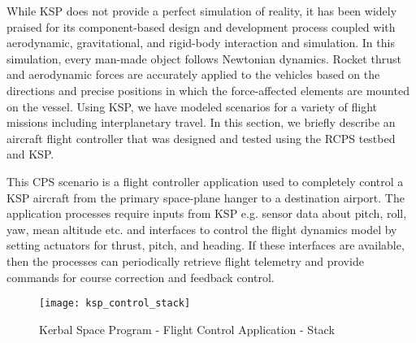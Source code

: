 While KSP does not provide a perfect simulation of reality, it has been widely praised for its component-based design and development process coupled with aerodynamic, gravitational, and rigid-body interaction and simulation. In this simulation, every man-made object follows Newtonian dynamics. Rocket thrust and aerodynamic forces are accurately applied to the vehicles based on the directions and precise positions in which the force-affected elements are mounted on the vessel. Using KSP, we have modeled scenarios for a variety of flight missions including interplanetary travel. In this section, we briefly describe an aircraft flight controller that was designed and tested using the RCPS testbed and KSP.

This CPS scenario is a flight controller application used to completely control a KSP aircraft from the primary space-plane hanger to a destination airport. The application processes require inputs from KSP e.g. sensor data about pitch, roll, yaw, mean altitude etc. and interfaces to control the flight dynamics model by setting actuators for thrust, pitch, and heading. If these interfaces are available, then the processes can periodically retrieve flight telemetry and provide commands for course correction and feedback control.

\begin{figure}[h]
	\centering
	\texttt{[image: ksp\_control\_stack]}
	\caption{Kerbal Space Program - Flight Control Application - Stack}
	\label{fig:ksp_control_stack}
\end{figure} 
\FloatBarrier 

